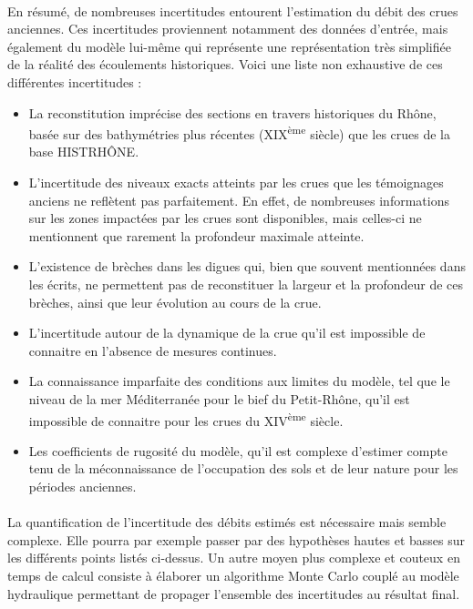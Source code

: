 	\paragraph{} En résumé, de nombreuses incertitudes entourent l'estimation du débit des crues anciennes. Ces incertitudes proviennent notamment des données d'entrée, mais également du modèle lui-même qui représente une représentation très simplifiée de la réalité des écoulements historiques. Voici une liste non exhaustive de ces différentes incertitudes :
	
	\begin{itemize}
		\item La reconstitution imprécise des sections en travers historiques du Rhône, basée sur des bathymétries plus récentes (XIX\textsuperscript{ème} siècle) que les crues de la base HISTRHÔNE.
		\item L'incertitude des niveaux exacts atteints par les crues que les témoignages anciens ne reflètent pas parfaitement. En effet, de nombreuses informations sur les zones impactées par les crues sont disponibles, mais celles-ci ne mentionnent que rarement la profondeur maximale atteinte.
		\item  L'existence de brèches dans les digues qui, bien que souvent mentionnées dans les écrits, ne permettent pas de reconstituer la largeur et la profondeur de ces brèches, ainsi que leur évolution au cours de la crue.
		\item L'incertitude autour de la dynamique de la crue qu'il est impossible de connaitre en l'absence de mesures continues.
		\item La connaissance imparfaite des conditions aux limites du modèle, tel que le niveau de la mer Méditerranée pour le bief du Petit-Rhône, qu'il est impossible de connaitre pour les crues du XIV\textsuperscript{ème} siècle.
		\item Les coefficients de rugosité du modèle, qu'il est complexe d'estimer compte tenu de la méconnaissance de l'occupation des sols et de leur nature pour les périodes anciennes.	
	\end{itemize}
		
	\paragraph{} La quantification de l'incertitude des débits estimés est nécessaire mais semble complexe. Elle pourra par exemple passer par des hypothèses hautes et basses sur les différents points listés ci-dessus. Un autre moyen plus complexe et couteux en temps de calcul consiste à élaborer un algorithme Monte Carlo couplé au modèle hydraulique permettant de propager l'ensemble des incertitudes au résultat final.	
	

